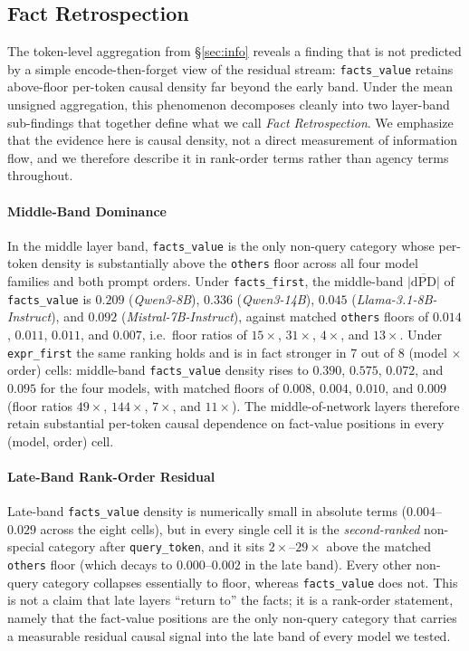 \documentclass[11pt]{article}
\begin{document}
\subsection{Fact Retrospection}
\label{sec:retro}
The token-level aggregation from §\ref{sec:info} reveals a finding that is not predicted by a simple encode-then-forget view of the residual stream: \texttt{facts\_value} retains above-floor per-token causal density far beyond the early band. Under the mean unsigned aggregation, this phenomenon decomposes cleanly into two layer-band sub-findings that together define what we call \textit{Fact Retrospection}. We emphasize that the evidence here is causal density, not a direct measurement of information flow, and we therefore describe it in rank-order terms rather than agency terms throughout.

\paragraph{Middle-Band Dominance} In the middle layer band, \texttt{facts\_value} is the only non-query category whose per-token density is substantially above the \texttt{others} floor across all four model families and both prompt orders. Under \texttt{facts\_first}, the middle-band $\overline{|\mathrm{dPD}|}$ of \texttt{facts\_value} is $0.209$ (\textit{Qwen3-8B}), $0.336$ (\textit{Qwen3-14B}), $0.045$ (\textit{Llama-3.1-8B-Instruct}), and $0.092$ (\textit{Mistral-7B-Instruct}), against matched \texttt{others} floors of $0.014$, $0.011$, $0.011$, and $0.007$, i.e.\ floor ratios of $15\times$, $31\times$, $4\times$, and $13\times$. Under \texttt{expr\_first} the same ranking holds and is in fact stronger in 7 out of 8 (model $\times$ order) cells: middle-band \texttt{facts\_value} density rises to $0.390$, $0.575$, $0.072$, and $0.095$ for the four models, with matched floors of $0.008$, $0.004$, $0.010$, and $0.009$ (floor ratios $49\times$, $144\times$, $7\times$, and $11\times$). The middle-of-network layers therefore retain substantial per-token causal dependence on fact-value positions in every (model, order) cell.

\paragraph{Late-Band Rank-Order Residual} Late-band \texttt{facts\_value} density is numerically small in absolute terms ($0.004$--$0.029$ across the eight cells), but in every single cell it is the \textit{second-ranked} non-special category after \texttt{query\_token}, and it sits $2\times$--$29\times$ above the matched \texttt{others} floor (which decays to $0.000$--$0.002$ in the late band). Every other non-query category collapses essentially to floor, whereas \texttt{facts\_value} does not. This is not a claim that late layers ``return to'' the facts; it is a rank-order statement, namely that the fact-value positions are the only non-query category that carries a measurable residual causal signal into the late band of every model we tested.
\end{document}
